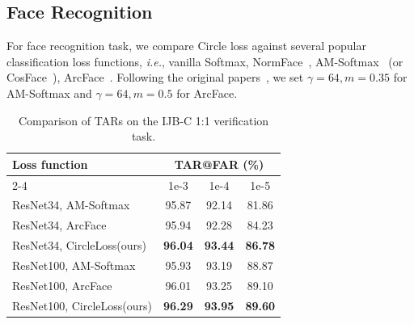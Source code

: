 \documentclass[10pt,twocolumn,letterpaper]{article}
\begin{document}
\subsection{Face Recognition}\label{sec:exp_face}





For face recognition task, we compare Circle loss against several popular classification loss functions, \emph{i.e.}, vanilla Softmax, NormFace~\cite{wang2017normface}, AM-Softmax~\cite{wang2018additive} (or CosFace~\cite{Wang_2018_CVPR}), ArcFace~\cite{deng2019arcface}. Following the original papers~\cite{wang2018additive, deng2019arcface}, we set $\gamma=64,m=0.35$ for AM-Softmax and $\gamma=64, m=0.5$ for ArcFace. %

\begin{table}[t]
    \small
    \centering
    \caption{Comparison of TARs on the IJB-C 1:1 verification task.}
    \label{tab:ijb-c}
    \begin{tabularx}{\linewidth}{Xccc}
    \toprule
     \multirow{2}{*}{Loss function} & \multicolumn{3}{c}{TAR@FAR (\%)} \\
     \cmidrule{2-4}
     & 1e-3 & 1e-4 & 1e-5 \\
     \midrule
    ResNet34, AM-Softmax~\cite{wang2018additive,Wang_2018_CVPR} & 95.87 & 92.14 & 81.86\\
    ResNet34, ArcFace~\cite{deng2019arcface} 	&95.94 & 92.28 & 84.23\\
    ResNet34, CircleLoss(ours) & \textbf{96.04} & \textbf{93.44} & \textbf{86.78} \\
    \hline
    ResNet100, AM-Softmax~\cite{wang2018additive,Wang_2018_CVPR} & 95.93 & 93.19 & 88.87\\
    ResNet100, ArcFace~\cite{deng2019arcface} 	&96.01 & 93.25 & 89.10\\
    ResNet100, CircleLoss(ours) & \textbf{96.29} & \textbf{93.95} & \textbf{89.60} \\
    \bottomrule
    \end{tabularx}
\end{table}
\end{document}
